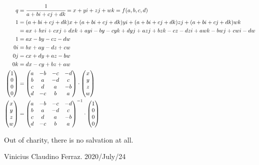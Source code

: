 \documentclass[12pt]{article}
\begin{document}
\begin{align}
  q &= \cfrac{1}{a + bi + cj + dk} = x + yi + zj + wk = f(a,b,c,d) \\
  1 &= (a + bi + cj + dk)x + (a + bi + cj + dk)yi + (a + bi + cj + dk)zj + (a + bi + cj + dk)wk \\
    &= ax + bxi + cxj + dxk + ayi - by - cyk + dyj + azj + bzk - cz - dzi + awk - bwj + cwi - dw \\
  1 &=  ax - by - cz - dw \\
  0i &= bx + ay - dz + cw \\
  0j &= cx + dy + az - bw \\
  0k &= dx - cy + bz + aw \\
  \begin{pmatrix} 1 \\ 0 \\ 0 \\ 0 \end{pmatrix} &= \begin{pmatrix} a & -b & -c & -d \\ b & a & -d & c \\ c & d & a & -b \\ d & -c & b & a \end{pmatrix} \cdot \begin{pmatrix} x \\ y \\ z \\ w \end{pmatrix} \\
  \begin{pmatrix} x \\ y \\ z \\ w \end{pmatrix} &= \begin{pmatrix} a & -b & -c & -d \\ b & a & -d & c \\ c & d & a & -b \\ d & -c & b & a \end{pmatrix}^{-1} \cdot \begin{pmatrix} 1 \\ 0 \\ 0 \\ 0 \end{pmatrix} 
\end{align}

\vspace{6mm}

Out of charity, there is no salvation at all.

Vinicius Claudino Ferraz. 2020/July/24
\end{document}
